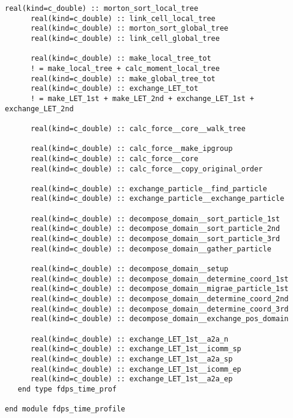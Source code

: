 \begin{lstlisting}[caption=時間プロファイル型 (Fortran)]
      real(kind=c_double) :: morton_sort_local_tree                                                
      real(kind=c_double) :: link_cell_local_tree                                                  
      real(kind=c_double) :: morton_sort_global_tree                                               
      real(kind=c_double) :: link_cell_global_tree                                                 
                                                                                                   
      real(kind=c_double) :: make_local_tree_tot                                                   
      ! = make_local_tree + calc_moment_local_tree                                                 
      real(kind=c_double) :: make_global_tree_tot                                                  
      real(kind=c_double) :: exchange_LET_tot                                                      
      ! = make_LET_1st + make_LET_2nd + exchange_LET_1st + exchange_LET_2nd                        
                                                                                                   
      real(kind=c_double) :: calc_force__core__walk_tree                                           
                                                                                                   
      real(kind=c_double) :: calc_force__make_ipgroup                                              
      real(kind=c_double) :: calc_force__core                                                      
      real(kind=c_double) :: calc_force__copy_original_order                                       
                                                                                                   
      real(kind=c_double) :: exchange_particle__find_particle                                       
      real(kind=c_double) :: exchange_particle__exchange_particle

      real(kind=c_double) :: decompose_domain__sort_particle_1st
      real(kind=c_double) :: decompose_domain__sort_particle_2nd
      real(kind=c_double) :: decompose_domain__sort_particle_3rd
      real(kind=c_double) :: decompose_domain__gather_particle

      real(kind=c_double) :: decompose_domain__setup
      real(kind=c_double) :: decompose_domain__determine_coord_1st
      real(kind=c_double) :: decompose_domain__migrae_particle_1st
      real(kind=c_double) :: decompose_domain__determine_coord_2nd
      real(kind=c_double) :: decompose_domain__determine_coord_3rd
      real(kind=c_double) :: decompose_domain__exchange_pos_domain

      real(kind=c_double) :: exchange_LET_1st__a2a_n
      real(kind=c_double) :: exchange_LET_1st__icomm_sp
      real(kind=c_double) :: exchange_LET_1st__a2a_sp
      real(kind=c_double) :: exchange_LET_1st__icomm_ep
      real(kind=c_double) :: exchange_LET_1st__a2a_ep
   end type fdps_time_prof

end module fdps_time_profile  
\end{lstlisting}

